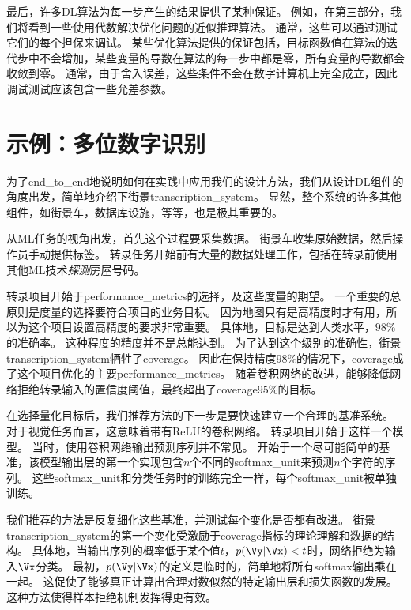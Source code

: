 
最后，许多\gls{DL}算法为每一步产生的结果提供了某种保证。
例如，在第三部分，我们将看到一些使用代数解决优化问题的近似推理算法。
通常，这些可以通过测试它们的每个担保来调试。
某些优化算法提供的保证包括，目标函数值在算法的迭代步中不会增加，某些变量的导数在算法的每一步中都是零，所有变量的导数都会收敛到零。
通常，由于舍入误差，这些条件不会在数字计算机上完全成立，因此调试测试应该包含一些允差参数。

\section{示例：多位数字识别}
\label{sec:example_multi_digit_number_recognition}
为了\gls{end_to_end}地说明如何在实践中应用我们的设计方法，我们从设计\gls{DL}组件的角度出发，简单地介绍下街景\gls{transcription_system}。
显然，整个系统的许多其他组件，如街景车，数据库设施，等等，也是极其重要的。

从\gls{ML}任务的视角出发，首先这个过程要采集数据。
街景车收集原始数据，然后操作员手动提供标签。
转录任务开始前有大量的数据处理工作，包括在转录前使用其他\gls{ML}技术\emph{探测}房屋号码。

转录项目开始于\gls{performance_metrics}的选择，及这些度量的期望。
一个重要的总原则是度量的选择要符合项目的业务目标。
因为地图只有是高精度时才有用，所以为这个项目设置高精度的要求非常重要。
具体地，目标是达到人类水平，$98\%$的准确率。
这种程度的精度并不是总能达到。
为了达到这个级别的准确性，街景\gls{transcription_system}牺牲了\gls{coverage}。
因此在保持精度$98\%$的情况下，\gls{coverage}成了这个项目优化的主要\gls{performance_metrics}。
随着卷积网络的改进，能够降低网络拒绝转录输入的置信度阈值，最终超出了\gls{coverage}$95\%$的目标。


在选择量化目标后，我们推荐方法的下一步是要快速建立一个合理的基准系统。
对于视觉任务而言，这意味着带有\gls{ReLU}的卷积网络。
转录项目开始于这样一个模型。
当时，使用卷积网络输出预测序列并不常见。
开始于一个尽可能简单的基准，该模型输出层的第一个实现包含$n$个不同的\gls{softmax_unit}来预测$n$个字符的序列。
这些\gls{softmax_unit}和分类任务时的训练完全一样，每个\gls{softmax_unit}被单独训练。


我们推荐的方法是反复细化这些基准，并测试每个变化是否都有改进。
街景\gls{transcription_system}的第一个变化受激励于\gls{coverage}指标的理论理解和数据的结构。
具体地，当输出序列的概率低于某个值$t$，$p(\Vy|\Vx) < t$时，网络拒绝为输入$\Vx$分类。
最初，$p(\Vy|\Vx)$的定义是临时的，简单地将所有\gls{softmax}输出乘在一起。
这促使了能够真正计算出合理对数似然的特定输出层和损失函数的发展。
这种方法使得样本拒绝机制发挥得更有效。


